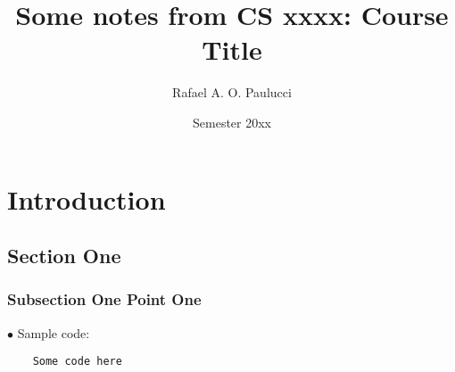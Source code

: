 \documentclass[english,openany]{book}
\begin{document}
    \title{Some notes from CS xxxx: Course Title}
    \author{Rafael A. O. Paulucci}
    \date{Semester 20xx}

    \maketitle

    \tableofcontents


    \chapter{Introduction}

    \section{Section One}

    \subsection{Subsection One Point One}

    $\bullet$ Sample code:

    \begin{lstlisting}
    Some code here
    \end{lstlisting}
\end{document}
